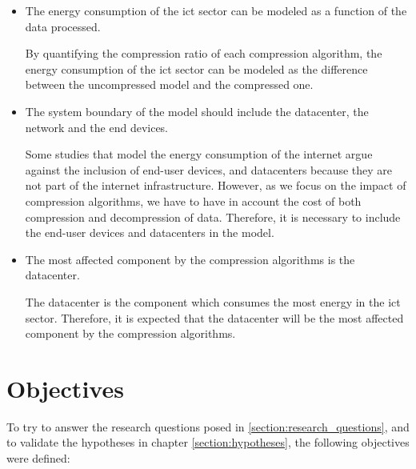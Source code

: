 \begin{itemize}
    \item The energy consumption of the \ac{ict} sector can be modeled as a function of the data processed.

    By quantifying the compression ratio of each compression algorithm, the energy consumption of the \ac{ict} sector can be modeled as the difference between the uncompressed model and the compressed one.
    
    \item The system boundary of the model should include the datacenter, the network and the end devices. 
    
    Some studies that model the energy consumption of the internet argue against the inclusion of end-user devices, and datacenters because they are not part of the internet infrastructure. However, as we focus on the impact of compression algorithms, we have to have in account the cost of both compression and decompression of data. Therefore, it is necessary to include the end-user devices and datacenters in the model.

    \item The most affected component by the compression algorithms is the datacenter.

    The datacenter is the component which consumes the most energy in the \ac{ict} sector. Therefore, it is expected that the datacenter will be the most affected component by the compression algorithms.

\end{itemize}


\section{Objectives}

To try to answer the research questions posed in \ref{section:research_questions}, and to validate the hypotheses in chapter \ref{section:hypotheses}, the following objectives were defined:

